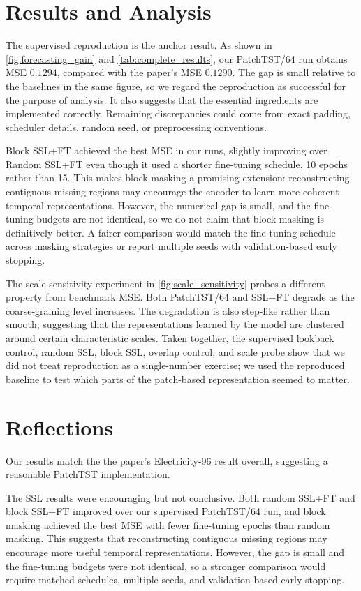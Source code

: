 \documentclass[11pt,twocolumn]{article}
\begin{document}
\section{Results and Analysis}
The supervised reproduction is the anchor result. As shown in \autoref{fig:forecasting_gain} and \autoref{tab:complete_results}, our PatchTST/64 run obtains MSE $0.1294$, compared with the paper's MSE $0.1290$. The gap is small relative to the baselines in the same figure, so we regard the reproduction as successful for the purpose of analysis. It also suggests that the essential ingredients are implemented correctly. Remaining discrepancies could come from exact padding, scheduler details, random seed, or preprocessing conventions.


Block SSL+FT achieved the best MSE in our runs, slightly improving over Random SSL+FT even though it used a shorter fine-tuning schedule, 10 epochs rather than 15. This makes block masking a promising extension: reconstructing contiguous missing regions may encourage the encoder to learn more coherent temporal representations. However, the numerical gap is small, and the fine-tuning budgets are not identical, so we do not claim that block masking is definitively better. A fairer comparison would match the fine-tuning schedule across masking strategies or report multiple seeds with validation-based early stopping.

The scale-sensitivity experiment in \autoref{fig:scale_sensitivity} probes a different property from benchmark MSE. Both PatchTST/64 and SSL+FT degrade as the coarse-graining level increases. The degradation is also step-like rather than smooth, suggesting that the representations learned by the model are clustered around certain characteristic scales. Taken together, the supervised lookback control, random SSL, block SSL, overlap control, and scale probe show that we did not treat reproduction as a single-number exercise; we used the reproduced baseline to test which parts of the patch-based representation seemed to matter.



\section{Reflections}


Our results match the the paper's Electricity-96 result overall, suggesting a reasonable PatchTST implementation. 

The SSL results were encouraging but not conclusive. Both random SSL+FT and block SSL+FT improved over our supervised PatchTST/64 run, and block masking achieved the best MSE with fewer fine-tuning epochs than random masking. This suggests that reconstructing contiguous missing regions may encourage more useful temporal representations. However, the gap is small and the fine-tuning budgets were not identical, so a stronger comparison would require matched schedules, multiple seeds, and validation-based early stopping.
\end{document}
